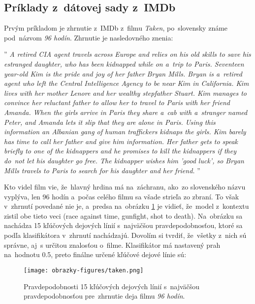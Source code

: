 \subsection*{Príklady z~dátovej sady z~IMDb}

Prvým príkladom je zhrnutie z~IMDb z~filmu \textit{Taken}, po~slovensky známe pod~názvom \textit{96 hodín}. Zhrnutie je nasledovného znenia:

\noindent''\textit{
A retired CIA agent travels across Europe and relies on his old skills to save his estranged daughter, who has been kidnapped while on a~trip to Paris. Seventeen year-old Kim is the pride and joy of her father Bryan Mills. Bryan is a~retired agent who left the Central Intelligence Agency to be near Kim in California. Kim lives with her mother Lenore and her wealthy stepfather Stuart. Kim manages to convince her reluctant father to allow her to travel to Paris with her friend Amanda. When the girls arrive in Paris they share a~cab with a~stranger named Peter, and Amanda lets it slip that they are alone in Paris. Using this information an Albanian gang of human traffickers kidnaps the girls. Kim barely has time to call her father and give him information. Her father gets to speak briefly to one of the kidnappers and he promises to kill the kidnappers if they do~not let his daughter go free. The kidnapper wishes him 'good luck', so Bryan Mills travels to Paris to search for his daughter and her friend.
}''

Kto videl film vie, že~hlavný hrdina má na~záchranu, ako~zo slovenského názvu vyplýva, len 96 hodín a~počas celého filmu sa všade strieľa zo zbraní. To však v~zhrnutí povedané nie je, a~predsa na~obrázku \ref{taken} je vidieť, že~model z~kontextu zistil obe tieto veci (race against time, gunfight, shot to death). Na~obrázku sa nachádza 15 kľúčových dejových línií s~najväčšou pravdepodobnosťou, ktoré sa podľa klasifikátora v~zhrnutí nachádzajú. Dovolím si tvrdiť, že~všetky z~nich sú správne, aj~s určitou znalosťou o~filme. Klasifikátor má nastavený prah na~hodnotu 0.5, preto finálne určené kľúčové dejové línie sú:


\begin{figure}[ht!]
	\centering
	\texttt{[image: obrazky-figures/taken.png]}
	\caption{Pravdepodobnosti 15 kľúčových dejových línií s~najväčšou pravdepodobnosťou pre~zhrnutie deja filmu \textit{96 hodín}.}
	\label{taken}
\end{figure}


